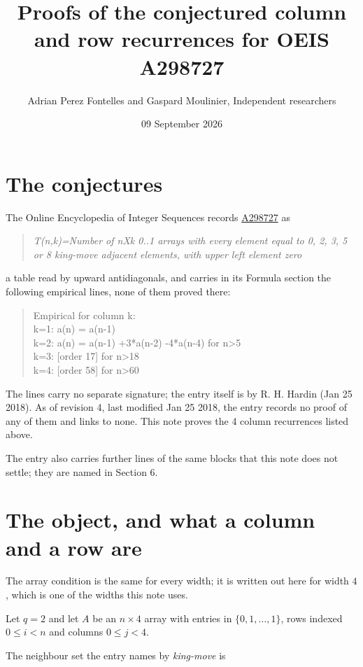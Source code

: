 \documentclass[11pt]{article}
\title{Proofs of the conjectured column and row recurrences for OEIS A298727}
\author{Adrian Perez Fontelles and Gaspard Moulinier, Independent researchers}
\date{09 September 2026}
\theoremstyle{definition}
\begin{document}
\maketitle
\section{The conjectures}

The Online Encyclopedia of Integer Sequences records \href{https://oeis.org/A298727}{A298727} as

\begin{quote}\itshape T(n,k)=Number of nXk 0..1 arrays with every element equal to 0, 2, 3, 5 or 8 king-move adjacent elements, with upper left element zero\end{quote}

a table read by upward antidiagonals, and carries in its Formula section the following empirical lines, none of them proved there:

\begin{quote}\ttfamily Empirical for column k:\\
k=1: a(n) = a(n-1)\\k=2: a(n) = a(n-1) +3*a(n-2) -4*a(n-4) for n>5\\k=3: [order 17] for n>18\\k=4: [order 58] for n>60\end{quote}

The lines carry no separate signature; the entry itself is by R. H. Hardin (Jan 25 2018). As of revision 4, last modified Jan 25 2018, the entry records no proof of any of them and links to none. This note proves the 4 column recurrences listed above.

The entry also carries further lines of the same blocks that this note does not settle; they are named in Section 6.

\section{The object, and what a column and a row are}

The array condition is the same for every width; it is written out here for width $4$, which is one of the widths this note uses.

Let $q = 2$ and let $A$ be an $n \times 4$ array with entries in $\{0,1,\dots,1\}$, rows indexed $0 \le i < n$ and columns $0 \le j < 4$.

The neighbour set the entry names by {\itshape king-move} is
\end{document}
